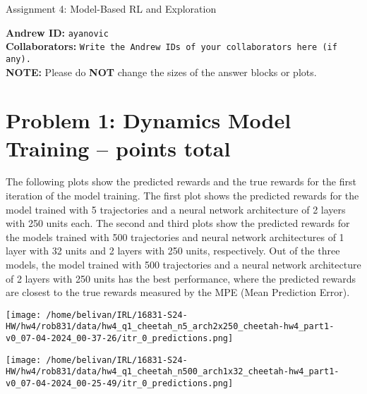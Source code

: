 \documentclass{article}
\begin{document}

\begin{centering}
    {\Large Assignment 4: Model-Based RL and Exploration
} \\
    \vspace{.25cm}
\end{centering}
\vspace{0.25cm}

\textbf{Andrew ID:} \texttt{ayanovic} \\
\textbf{Collaborators:} \texttt{Write the Andrew IDs of your collaborators here (if any).}\\ 
\textbf{NOTE:} Please do \textbf{NOT} change the sizes of the answer blocks or plots.

\section{Problem 1: Dynamics Model Training --  points total\rbrack}
\begin{answer}[title=Theory questions,height=4.5cm,width=\linewidth]
    The following plots show the predicted rewards and the true rewards for the first iteration of the model training. 
    The first plot shows the predicted rewards for the model trained with 5 trajectories
    and a neural network architecture of 2 layers with 250 units each. 
    The second and third plots show the predicted rewards for the models trained with 
    500 trajectories and neural network architectures of 1 layer with 32 units and 2 layers with 250 units,
    respectively. Out of the three models, the model trained with 500 trajectories and a neural network architecture of 2 layers with 250 units
    has the best performance, where the predicted rewards are closest to the true rewards measured by the MPE (Mean Prediction Error).
\end{answer}


\begin{answer}[title=Performance Plot Cheetah Env (1),height=9.5cm,width=\linewidth]
\centering
\texttt{[image: /home/belivan/IRL/16831-S24-HW/hw4/rob831/data/hw4\_q1\_cheetah\_n5\_arch2x250\_cheetah-hw4\_part1-v0\_07-04-2024\_00-37-26/itr\_0\_predictions.png]}
\end{answer}

\begin{answer}[title=Performance Plot Cheetah Env (2),height=9.5cm,width=\linewidth]
\centering
\texttt{[image: /home/belivan/IRL/16831-S24-HW/hw4/rob831/data/hw4\_q1\_cheetah\_n500\_arch1x32\_cheetah-hw4\_part1-v0\_07-04-2024\_00-25-49/itr\_0\_predictions.png]}
\end{answer}
\end{document}
